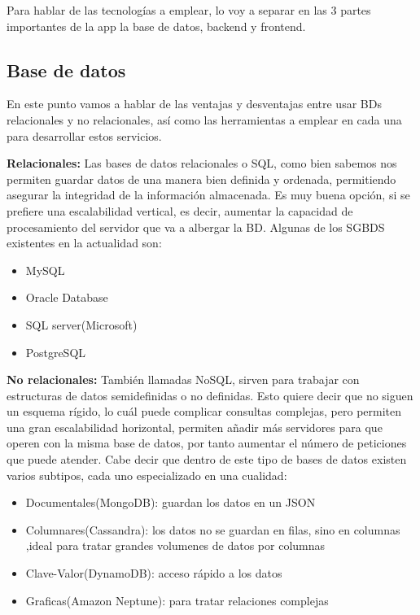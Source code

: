 Para hablar de las tecnologías a emplear, lo voy a separar en las 3 partes importantes de la app la base de datos, backend y frontend.

\subsection{Base de datos}

En este punto vamos a hablar de las ventajas y desventajas entre usar BDs relacionales y no relacionales, así como las herramientas a emplear en cada una para desarrollar estos servicios.

\textbf{Relacionales:} Las bases de datos relacionales o SQL, como bien sabemos nos permiten guardar datos de una manera bien definida y ordenada, permitiendo asegurar la integridad de la información almacenada. Es muy buena opción, si se prefiere una escalabilidad vertical, es decir, aumentar la capacidad de procesamiento del servidor que va a albergar la BD. Algunas de los SGBDS existentes en la actualidad son:

\begin{itemize}
	\item MySQL
	\item Oracle Database
	\item SQL server(Microsoft)
	\item PostgreSQL
\end{itemize}

\textbf{No relacionales:} También llamadas NoSQL, sirven para trabajar con estructuras de datos semidefinidas o no definidas. Esto quiere decir que no siguen un esquema rígido, lo cuál puede complicar consultas complejas, pero permiten una gran escalabilidad horizontal, permiten añadir más servidores para que operen con la misma base de datos, por tanto aumentar el número de peticiones que puede atender. Cabe decir que dentro de este tipo de bases de datos existen varios subtipos, cada uno especializado en una cualidad:

\begin{itemize}
	\item Documentales(MongoDB): guardan los datos en un JSON
	\item Columnares(Cassandra): los datos no se guardan en filas, sino en columnas ,ideal para tratar grandes volumenes de datos por columnas
	\item Clave-Valor(DynamoDB): acceso rápido a los datos
	\item Graficas(Amazon Neptune): para tratar relaciones complejas
\end{itemize}

